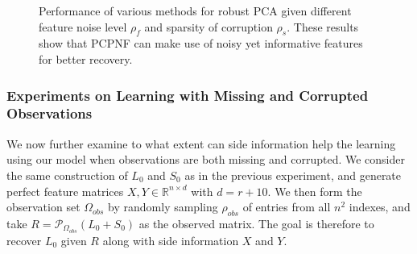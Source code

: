 \documentclass[twoside,11pt]{article}
\def\R{\mathbb{R}}
\def\Obs{\Omega_{obs}}
\newcommand\proj[1]{{\mathcal P}_{#1}}
\def\realL{L_0}
\def\realS{S_0}
\begin{document}
\begin{figure}[tp]
  \centering
  \caption{Performance of various methods for robust PCA given different feature
    noise level $\rho_f$ and sparsity of corruption $\rho_s$.
    These results show that PCPNF can make
      use of noisy yet informative features for better recovery.
  }
  \label{fig:PCPNF_synthetic}
\end{figure}

\subsubsection{Experiments on Learning with Missing and Corrupted Observations}
We now further examine to what extent can side information help
the learning using our model when observations are both missing and corrupted.
We consider the same construction of $\realL$ and $\realS$ as in the previous experiment,
and generate perfect feature matrices $X, Y \in \R^{n \times d}$ with $d = r+10$.
We then form the observation set $\Obs$ by randomly sampling $\rho_{obs}$ of entries from
all $n^2$ indexes, and take $R = \proj{\Obs}(\realL + \realS)$
as the observed matrix.  The goal is therefore to recover $\realL$ given $R$
along with side information $X$ and $Y$.
\end{document}
